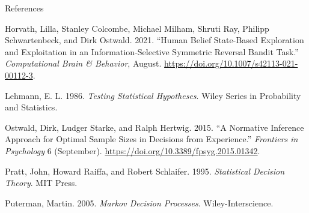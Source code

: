 \documentclass[
  8pt,
  ignorenonframetext,
]{beamer}
\newlength{\cslhangindent}
\newlength{\cslentryspacingunit} %
\newenvironment{CSLReferences}[2] %
 {%
  \setlength{\parindent}{0pt}
  \ifodd #1
  \let\oldpar\par
  \def\par{\hangindent=\cslhangindent\oldpar}
  \fi
  \setlength{\parskip}{#2\cslentryspacingunit}
 }%
 {}
\begin{document}
\begin{frame}{References}
\protect\hypertarget{references}{}
\footnotesize

\hypertarget{refs}{}
\begin{CSLReferences}{1}{0}
\leavevmode{}%
Horvath, Lilla, Stanley Colcombe, Michael Milham, Shruti Ray, Philipp
Schwartenbeck, and Dirk Ostwald. 2021. {``Human {Belief State}-{Based
Exploration} and {Exploitation} in an {Information}-{Selective Symmetric
Reversal Bandit Task}.''} \emph{Computational Brain \& Behavior},
August. \url{https://doi.org/10.1007/s42113-021-00112-3}.

\leavevmode{}%
Lehmann, E. L. 1986. \emph{Testing Statistical Hypotheses}. {Wiley
Series in Probability and Statistics}.

\leavevmode{}%
Ostwald, Dirk, Ludger Starke, and Ralph Hertwig. 2015. {``A Normative
Inference Approach for Optimal Sample Sizes in Decisions from
Experience.''} \emph{Frontiers in Psychology} 6 (September).
\url{https://doi.org/10.3389/fpsyg.2015.01342}.

\leavevmode{}%
Pratt, John, Howard Raiffa, and Robert Schlaifer. 1995.
\emph{Statistical {Decision Theory}}. {MIT Press}.

\leavevmode{}%
Puterman, Martin. 2005. \emph{Markov Decision Processes}.
{Wiley-Interscience}.

\end{CSLReferences}
\end{frame}
\end{document}
